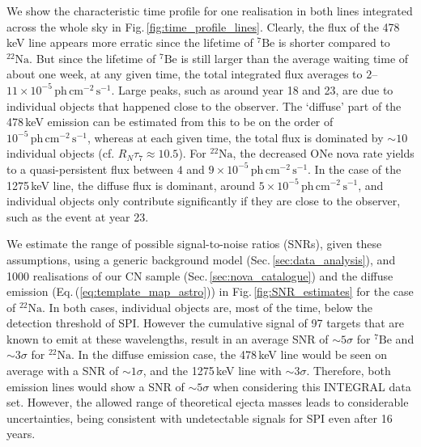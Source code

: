 \documentclass{aa}
\newcommand{\mrm}[1]{\mathrm{#1}}
\newcommand{\nuc}[2]{$\mrm{^{#2}#1}$}
\begin{document}
We show the characteristic time profile for one realisation in both lines integrated across the whole sky in Fig.\,\ref{fig:time_profile_lines}.
%
Clearly, the flux of the 478\,keV line appears more erratic since the lifetime of \nuc{Be}{7} is shorter compared to \nuc{Na}{22}.
%
But since the lifetime of \nuc{Be}{7} is still larger than the average waiting time of about one week, at any given time, the total integrated flux averages to $2$--$11 \times 10^{-5}\,\mathrm{ph\,cm^{-2}\,s^{-1}}$.
%
Large peaks, such as around year 18 and 23, are due to individual objects that happened close to the observer.
%
The `diffuse' part of the 478\,keV emission can be estimated from this to be on the order of $10^{-5}\,\mathrm{ph\,cm^{-2}\,s^{-1}}$, whereas at each given time, the total flux is dominated by $\sim 10$ individual objects (cf. $R_N \tau_7 \approx 10.5$).
%
For \nuc{Na}{22}, the decreased ONe nova rate yields to a quasi-persistent flux between $4$ and $9 \times 10^{-5}\,\mathrm{ph\,cm^{-2}\,s^{-1}}$.
%
In the case of the 1275\,keV line, the diffuse flux is dominant, around $5 \times 10^{-5}\,\mathrm{ph\,cm^{-2}\,s^{-1}}$, and individual objects only contribute significantly if they are close to the observer, such as the event at year 23.

We estimate the range of possible signal-to-noise ratios (SNRs), given these assumptions, using a generic background model (Sec.\,\ref{sec:data_analysis}), and 1000 realisations of our CN sample (Sec.\,\ref{sec:nova_catalogue}) and the diffuse emission (Eq.\,(\ref{eq:template_map_astro})) in Fig.\,\ref{fig:SNR_estimates} for the case of \nuc{Na}{22}.
%
In both cases, individual objects are, most of the time, below the detection threshold of SPI.
%
However the cumulative signal of 97 targets that are known to emit at these wavelengths, result in an average SNR of $\sim 5\sigma$ for \nuc{Be}{7} and $\sim 3\sigma$ for \nuc{Na}{22}.
%
In the diffuse emission case, the 478\,keV line would be seen on average with a SNR of $\sim 1\sigma$, and the 1275\,keV line with $\sim 3\sigma$.
%
Therefore, both emission lines would show a SNR of $\sim 5\sigma$ when considering this INTEGRAL data set.
%
However, the allowed range of theoretical ejecta masses leads to considerable uncertainties, being consistent with undetectable signals for SPI even after 16 years.
\end{document}
